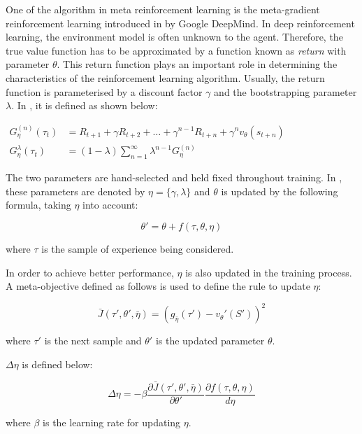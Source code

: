 One of the algorithm in meta reinforcement learning is the meta-gradient reinforcement learning introduced in \cite{meta-gradient} by Google DeepMind. In deep reinforcement learning, the environment model is often unknown to the agent. Therefore, the true value function has to be approximated by a function known as \textit{return} with parameter $\theta$. This return function plays an important role in determining the characteristics of the reinforcement learning algorithm. Usually, the return function is parameterised by a discount factor $\gamma$ and the bootstrapping parameter $\lambda$. In \cite{meta-gradient}, it is defined as shown below:

\begin{math}
	\begin{aligned}
		G_\eta^{(n)}(\tau_t) &= R_{t+1} + \gamma R_{t+2} + \dots + \gamma^{n-1}R_{t+n} + \gamma^n v_\theta(s_{t+n})\\
		G_\eta^{\lambda}(\tau_t) &= (1-\lambda) \sum_{n=1}^\infty \lambda^{n-1} G_\eta^{(n)}
	\end{aligned}
\end{math}

The two parameters are hand-selected and held fixed throughout training. In \cite{meta-gradient}, these parameters are denoted by $\eta = \{\gamma, \lambda\}$ and $\theta$ is updated by the following formula, taking $\eta$ into account:

\[\theta' = \theta + f(\tau, \theta, \eta)\]

where $\tau$ is the sample of experience being considered.

\par
In order to achieve better performance, $\eta$ is also updated in the training process. A meta-objective defined as follows is used to define the rule to update $\eta$:

\[\bar{J}(\tau', \theta', \bar{\eta}) = (g_{\bar{\eta}}(\tau') - v_\theta'(S'))^2\]

where $\tau'$ is the next sample and $\theta'$ is the updated parameter $\theta$.

$\Delta\eta$ is defined below:

\[\Delta \eta = -\beta \frac{\partial \bar{J}(\tau', \theta', \bar{\eta})}{\partial \theta'} \frac{\partial f(\tau, \theta, \eta)}{d\eta}\]

where $\beta$ is the learning rate for updating $\eta$.

